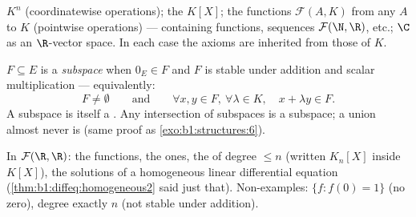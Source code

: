 \begin{example}\label{ex:b1:vspaces:examples}
$K^n$ (coordinatewise operations); the  $K[X]$; the
functions $\mathcal{F}(A, K)$ from any  $A$ to $K$ (pointwise
operations) --- containing  functions, sequences
$\mathcal{F}(\N, \R)$, etc.; $\C$ as an $\R$-vector space. In each
case the axioms are inherited from those of $K$.
\end{example}

\begin{definition}[Subspace]\label{def:b1:vspaces:subspace}
$F \subseteq E$ is a \emph{subspace} when $0_E \in
F$ and $F$ is stable under addition and scalar multiplication ---
equivalently:
\[
F \neq \emptyset
\qquad\text{and}\qquad
\forall x, y \in F,\ \forall \lambda \in K,\quad
x + \lambda y \in F .
\]
A subspace is itself a . Any intersection of subspaces
is a subspace; a union almost never is (same proof as
\cref{exo:b1:structures:6}).
\end{definition}

\begin{example}\label{ex:b1:vspaces:subspaces}
In $\mathcal{F}(\R, \R)$: the  functions, the
 ones, the  of degree $\leq n$ (written
$K_n[X]$ inside $K[X]$), the solutions of a homogeneous linear
differential equation (\cref{thm:b1:diffeq:homogeneous2} said just
that). Non-examples: $\{f : f(0) = 1\}$ (no zero), degree exactly
$n$ (not stable under addition).
\end{example}

